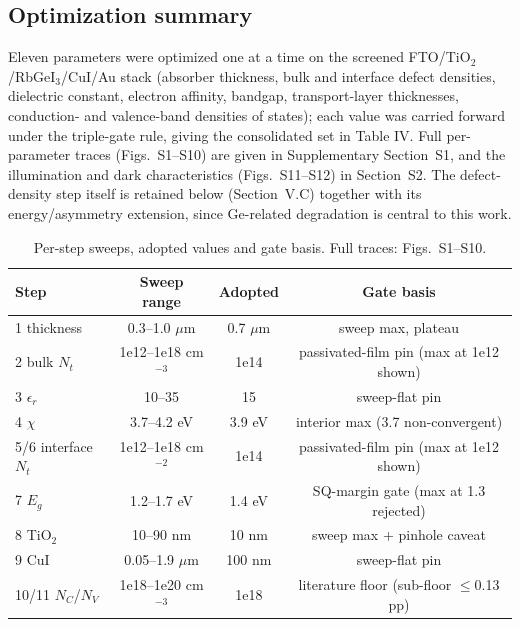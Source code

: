 \documentclass[review]{elsarticle}
\begin{document}
\subsection{Optimization summary}
Eleven parameters were optimized one at a time on the screened
FTO/TiO$_{2}$/RbGeI$_{3}$/CuI/\allowbreak{}Au stack (absorber thickness, bulk
and interface defect densities, dielectric constant, electron affinity,
bandgap, transport-layer thicknesses, conduction- and valence-band densities
of states); each value was carried forward under the triple-gate rule, giving the consolidated set in
Table IV. Full per-parameter traces (Figs.\ S1--S10) are given in
Supplementary Section~S1, and the illumination and dark characteristics
(Figs.\ S11--S12) in Section~S2. The defect-density step itself is retained
below (Section~V.C) together with its energy/asymmetry extension, since
Ge-related degradation is central to this work.

\begin{table}[htbp]
\centering
{\footnotesize\setlength{\tabcolsep}{3pt}
\begin{tabularx}{\textwidth}{Xccc}
\hline
Step & Sweep range & Adopted & Gate basis
\\\hline
1 thickness & 0.3--1.0 $\mu$m & 0.7 $\mu$m & sweep max, plateau \\
2 bulk $N_{t}$ & 1e12--1e18 cm$^{-3}$ & 1e14 & passivated-film pin (max at 1e12 shown) \\
3 $\epsilon_{r}$ & 10--35 & 15 & sweep-flat pin \\
4 $\chi$ & 3.7--4.2 eV & 3.9 eV & interior max (3.7 non-convergent) \\
5/6 interface $N_{t}$ & 1e12--1e18 cm$^{-2}$ & 1e14 & passivated-film pin (max at 1e12 shown) \\
7 $E_{g}$ & 1.2--1.7 eV & 1.4 eV & SQ-margin gate (max at 1.3 rejected) \\
8 TiO$_{2}$ & 10--90 nm & 10 nm & sweep max + pinhole caveat \\
9 CuI & 0.05--1.9 $\mu$m & 100 nm & sweep-flat pin \\
10/11 $N_{C}$/$N_{V}$ & 1e18--1e20 cm$^{-3}$ & 1e18 & literature floor (sub-floor $\le$0.13 pp) \\
\hline
\end{tabularx}
}
\caption{Per-step sweeps, adopted values and gate basis. Full traces: Figs.~S1--S10.}
\end{table}
\end{document}
